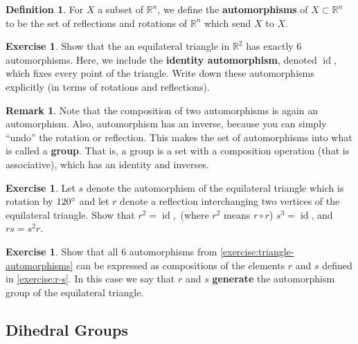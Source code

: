 \documentclass[reqno, 12pt, letter]{article}
\theoremstyle{plain}
\theoremstyle{definition}
\newtheorem{definition}[theorem]{Definition}
\newtheorem{remark}[theorem]{Remark}
\newtheorem{exercise}[theorem]{Exercise}
\theoremstyle{remark}
\numberwithin{equation}{section}
\newcommand\br{{\mathbb R}}
\DeclareMathOperator\id{id}
\begin{document}
\begin{definition}
	\label{definition:automorphisms}
	For $X$ a subset of $\br^n$, we define the {\bf automorphisms} of $X \subset \br^n$ to be the set of
	reflections and rotations of $\br^n$ which send $X$ to $X$.
\end{definition}

\begin{exercise}
	\label{exercise:triangle-automorphisms}
	Show that the an equilateral triangle in $\br^2$ has exactly $6$ automorphisms.
	Here, we include the {\bf identity automorphism}, denoted $\id$, which fixes every point of the triangle.
	Write down these automorphisms explicitly (in terms of rotations and reflections).
\end{exercise}
\begin{remark}
	\label{remark:aut-is-group}
	Note that the composition of two automorphisms is again an automorphism.
	Also, automorphism has an inverse, because you can simply ``undo'' the rotation or reflection.
	This makes the set of automorphisms into what is called a {\bf group}. That is,
	a group is a set with a composition operation (that is associative), which has an identity and inverses.
\end{remark}
\begin{exercise}
	\label{exercise:r-s}
	Let $s$ denote the automorphism of the equilateral triangle which is rotation by $120\degree$
	and let $r$ denote a reflection interchanging two vertices of the equilateral triangle.
	Show that $r^2= \id,$ (where $r^2$ means $r \circ r$) $s^3 = \id$, and $rs = s^2r$.
\end{exercise}
\begin{exercise}
	\label{exercise:}
	Show that all $6$ automorphisms from \autoref{exercise:triangle-automorphisms} can be expressed as compositions
	of the elements $r$ and $s$ defined in \autoref{exercise:r-s}. In this case we say that $r$ and $s$ {\bf generate}
	the automorphism group of the equilateral triangle.
\end{exercise}

\subsection{Dihedral Groups}
\end{document}
